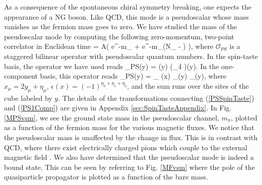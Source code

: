 \documentclass[aps,prd,twocolumn,showpacs,superscriptaddress,groupedaddress]{revtex4}  %
\begin{document}
As a consequence of the spontaneous chiral symmetry breaking, one expects the appearance of a NG boson. Like QCD, this mode is a pseudoscalar whose mass vanishes as the fermion mass goes to zero.
We have studied the mass of the pseudoscalar mode by computing the following zero-momentum, two-point correlator in Euclidean time
\beq
\label{PS2Point}
 = A\left( e^{-m_{\pi}\tau} + e^{-m_{\pi}(N_{\tau} - \tau)} \right),
\eeq
where $\mathcal{O}_{PS}$ is a staggered bilinear operator with pseudoscalar quantum numbers. In the spin-taste basis, the operator we have used reads
\beq
\label{PSSpinTaste}
_{PS}(y) = \Bpsi(y) \left(\tilde{\gamma}_4 \otimes {} \right)\Psi(y).
\eeq
In the one-component basis, this operator reads
\beq
\label{PS1Comp}
_{PS}(y) = \sum_{\eta} \epsilon(x) \chib_{\eta}(y) \chi_{\eta}(y),
\eeq
where $x_{\mu} = 2y_{\mu} + \eta_{\mu}$, $\epsilon(x) = (-1)^{\eta_0 + \eta_1 + \eta_2}$, and the sum runs over the sites of the cube labeled by $y$. The details of the transformations connecting (\ref{PSSpinTaste}) and (\ref{PS1Comp}) are given in Appendix \ref{sec:SpinTasteAppendix}.
In Fig. \ref{MPSvsm}, we see the ground state mass in the pseudoscalar channel, $m_{\pi}$, plotted as a function of the fermion mass for the various magnetic fluxes.  
We notice that the pseudoscalar mass is unaffected by the change in flux. This is in contrast with QCD, where there exist electrically charged  pions which couple to the 
external magnetic field \cite{SmilgaShushpanov}. We also have determined that the pseudoscalar mode is indeed a bound state. This can be seen by referring to Fig. \ref{MFvsm} where the pole
of the quasiparticle propagator is plotted as a function of the bare mass.  
\end{document}

